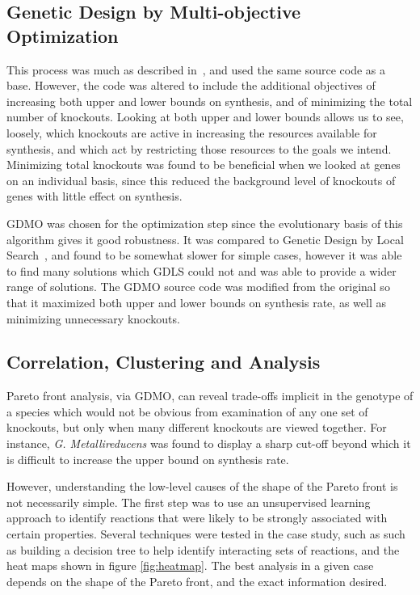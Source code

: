 \documentclass[a4paper,11pt]{article}
\begin{document}
\subsection{Genetic Design by Multi-objective Optimization}
This process was much as described in~\cite{Costanza2012}, and used the same source code as a base. However, the code was altered to include the additional objectives of increasing both upper and lower bounds on synthesis, and of minimizing the total number of knockouts. Looking at both upper and lower bounds allows us to see, loosely, which knockouts are active in increasing the resources available for synthesis, and which act by restricting those resources to the goals we intend. Minimizing total knockouts was found to be beneficial when we looked at genes on an individual basis, since this reduced the background level of knockouts of genes with little effect on synthesis.

GDMO was chosen for the optimization step since the evolutionary basis of this algorithm gives it good robustness. It was compared to Genetic Design by Local Search~\cite{Lun2009}, and found to be somewhat slower for simple cases, however it was able to find many solutions which GDLS could not and was able to provide a wider range of solutions. The GDMO source code was modified from the original so that it maximized both upper and lower bounds on synthesis rate, as well as minimizing unnecessary knockouts.

\subsection{Correlation, Clustering and Analysis}
Pareto front analysis, via GDMO, can reveal trade-offs implicit in the genotype of a species which would not be obvious from examination of any one set of knockouts, but only when many different knockouts are viewed together. For instance, {\it G. Metallireducens} was found to display a sharp cut-off beyond which it is difficult to increase the upper bound on synthesis rate.

However, understanding the low-level causes of the shape of the Pareto front is not necessarily simple. The first step was to use an unsupervised learning approach to identify reactions that were likely to be strongly associated with certain properties. Several techniques were tested in the case study, such as such as building a decision tree to help identify interacting sets of reactions, and the heat maps shown in figure \ref{fig:heatmap}. The best analysis in a given case depends on the shape of the Pareto front, and the exact information desired. 
\end{document}
